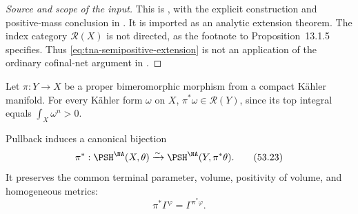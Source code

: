 \begin{proof}[Source and scope of the input]
This is \cite[Proposition~13.1.5]{XiaBook}, with the explicit
construction and positive-mass conclusion in
\cite[Lemma~3.8, using Lemma~2.10]{XiaOperationsV3}.
It is imported as an analytic extension theorem.
The index category $\mathcal R(X)$ is not directed, as the footnote
to Proposition~13.1.5 specifies.  Thus
\eqref{eq:tna-semipositive-extension} is not an application of the
ordinary cofinal-net argument in .
\end{proof}

Let $\pi:Y\to X$ be a proper bimeromorphic morphism from a compact
K\"ahler manifold.  For every K\"ahler form $\omega$ on $X$,
$\pi^*\omega\in\mathcal R(Y)$, since its top integral equals
$\int_X\omega^n>0$.

\begin{theorem}\label{thm:tna-bimeromorphic}
Pullback induces a canonical bijection
\[
 \pi^*:\PSH^{\NA}(X,\theta)
       \xrightarrow{\sim}
       \PSH^{\NA}(Y,\pi^*\theta).
\tag{53.23}\label{eq:tna-bimeromorphic}
\]
It preserves the common terminal parameter, volume, positivity of
volume, and homogeneous metrics:
\[
 \pi^*\Gamma^\varphi=\Gamma^{\pi^*\varphi}.
\tag{53.24}\label{eq:tna-bimeromorphic-homogeneous}
\]
\end{theorem}

